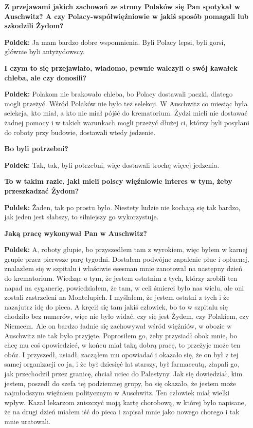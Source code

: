 \begin{otherlanguage}{polish}
\textbf{Z przejawami jakich zachowań ze strony Polaków się Pan spotykał w Auschwitz? A czy Polacy-współwięźniowie w jakiś sposób pomagali lub szkodzili Żydom?}

\textbf{Poldek:} Ja mam bardzo dobre wspomnienia. Byli Polacy lepsi, byli gorsi, głównie byli antyżydowscy.

\textbf{I czym to się przejawiało, wiadomo, pewnie walczyli o swój kawałek chleba, ale czy donosili?}
  
\textbf{Poldek:} Polakom nie brakowało chleba, bo Polacy dostawali paczki, dlatego mogli przeżyć. Wśród Polaków nie było też selekcji. W Auschwitz co miesiąc była selekcja, kto miał, a kto nie miał pójść do krematorium. Żydzi mieli nie dostawać żadnej pomocy i w takich warunkach mogli przeżyć dłużej ci, którzy byli posyłani do roboty przy budowie, dostawali wtedy jedzenie.

\textbf{Bo byli potrzebni?}

\textbf{Poldek:} Tak, tak, byli potrzebni, więc dostawali trochę więcej jedzenia. 

\textbf{To w takim razie, jaki mieli polscy więźniowie interes w tym, żeby przeszkadzać Żydom?}

\textbf{Poldek:} Żaden, tak po prostu było. Niestety ludzie nie kochają się tak bardzo, jak jeden jest słabszy, to silniejszy go wykorzystuje.

\textbf{Jaką pracę wykonywał Pan w Auschwitz?}
 
\textbf{Poldek:} A, roboty głupie, bo przyszedłem tam z wyrokiem, więc byłem w karnej grupie przez pierwsze parę tygodni. Dostałem podwójne zapalenie płuc i opłucnej, znalazłem się w szpitalu i właściwie esesman mnie zanotował na następny dzień do krematorium. Wiedząc o tym, że jestem ostatnim z tych, którzy zrobili ten napad na cyganerię, powiedziałem, że tam, w celi śmierci było nas wielu, ale oni zostali zastrzeleni na Montelupich. I myślałem, że jestem ostatni z tych i że nazajutrz idę do pieca. A kręcił się tam jakiś człowiek, bo to w szpitalu się chodziło bez numerów, więc nie było widać, czy się jest Żydem, czy Polakiem, czy Niemcem. Ale on bardzo ładnie się zachowywał wśród więźniów, w obozie w Auschwitz nie tak było przyjęte. Poprosiłem go, żeby przysiadł obok mnie, bo chcę mu coś opowiedzieć, w końcu miał taką dobrą pracę, to przeżyje może ten obóz. I przyszedł, usiadł, zacząłem mu opowiadać i okazało się, że on był z tej samej organizacji co ja, i że był dziesięć lat starszy, był farmaceutą, złapali go, jak przechodził przez granicę, chciał uciec do Palestyny. Jak się dowiedział, kim jestem, poszedł do szefa tej podziemnej grupy, bo się okazało, że jestem może najmłodszym więźniem politycznym w Auschwitz. Ten człowiek miał wielki wpływ. Kazał lekarzom zniszczyć moją kartę chorobową, w której było napisane, że na drugi dzień miałem iść do pieca i zapisał mnie jako nowego chorego i tak mnie uratowali. 
  

\end{otherlanguage}
